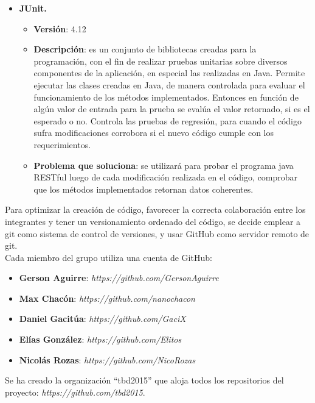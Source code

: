 \documentclass{memoria}
\begin{document}
\begin{itemize}
\item \textbf{JUnit.}
	\begin{itemize}
	\item \textbf{Versión}: 4.12 
	\item \textbf{Descripción}: es un conjunto de bibliotecas creadas para la programación, con el fin de realizar pruebas unitarias sobre diversos componentes de la aplicación, en especial las realizadas en Java. Permite ejecutar las clases creadas en Java, de manera controlada para evaluar el funcionamiento de los métodos implementados. Entonces en función de algún valor de entrada para la prueba se evalúa el valor retornado, si es el esperado o no. Controla las pruebas de regresión, para cuando el código sufra modificaciones corrobora si el nuevo código cumple con los requerimientos.
	\item \textbf{Problema que soluciona}: se utilizará para probar el programa java RESTful luego de cada modificación realizada en el código, comprobar que los métodos implementados retornan datos coherentes.
	\end{itemize}
\end{itemize}


    
Para optimizar la creación de código, favorecer la correcta colaboración entre los integrantes y tener un versionamiento ordenado del código, se decide emplear a git como sistema de control de versiones, y usar GitHub como servidor remoto de git.\\

Cada miembro del grupo utiliza una cuenta de GitHub:

\begin{itemize}
	\item \textbf{Gerson Aguirre}: \textsl{https://github.com/GersonAguirre}
	\item \textbf{Max Chacón}: \textsl{https://github.com/nanochacon}
	\item \textbf{Daniel Gacitúa}: \textsl{https://github.com/GaciX}
	\item \textbf{Elías González}: \textsl{https://github.com/Elitos}
	\item \textbf{Nicolás Rozas}: \textsl{https://github.com/NicoRozas}
\end{itemize}

Se ha creado la organización “tbd2015” que aloja todos los repositorios del proyecto: \textsl{https://github.com/tbd2015}.\\
\end{document}
